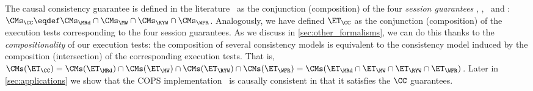 

%
%
%
%
%
The causal consistency guarantee is defined in the literature~\cite{session2causal} as the conjunction (composition) of the four \emph{session guarantees} \MRd, \MW, \RYW\ and \WFR:   
$\CMs_{\CC} \eqdef \CMs_{\MRd} \cap \CMs_{\MW} \cap \CMs_{\RYW} \cap \CMs_{\WFR}$. 
Analogously, we have defined $\ET_\CC$ as the conjunction (composition) of the execution tests corresponding to the four session guarantees.
As we discuss in \cref{sec:other_formalisms}, we can do this thanks to the \emph{compositionality} of our execution tests:
the composition of several consistency models is equivalent to the consistency model induced by the composition (intersection) of the corresponding execution tests. 
That is, $\CMs(\ET_\CC) = \CMs(\ET_{\MRd}) \cap \CMs(\ET_{\MW}) \cap \CMs(\ET_{\RYW}) \cap \CMs(\ET_{\WFR}) = \CMs(\ET_{\MRd} \cap \ET_{\MW} \cap \ET_{\RYW} \cap \ET_{\WFR})$.
Later in \cref{sec:applications} we show that the COPS implementation~\cite{cops} is causally consistent in that it satisfies the $\CC$ guarantees. 

